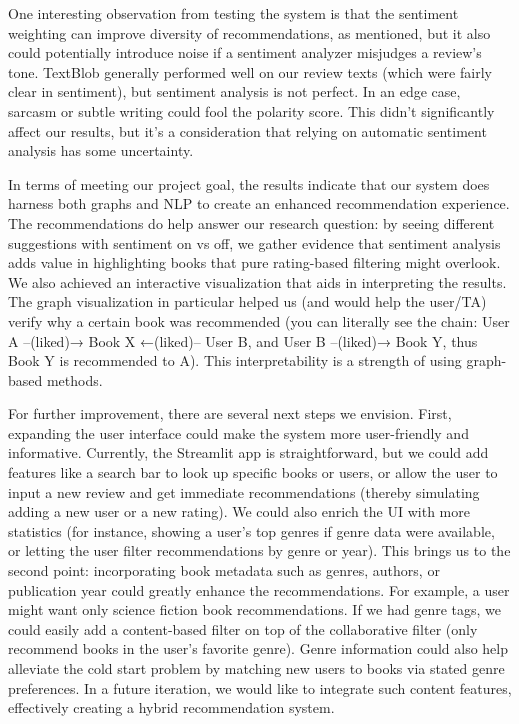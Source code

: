 \documentclass[11pt]{article}
\begin{document}
One interesting observation from testing the system is that the sentiment weighting can improve diversity of recommendations, as mentioned, but it also could potentially introduce noise if a sentiment analyzer misjudges a review’s tone. TextBlob generally performed well on our review texts (which were fairly clear in sentiment), but sentiment analysis is not perfect. In an edge case, sarcasm or subtle writing could fool the polarity score. This didn’t significantly affect our results, but it’s a consideration that relying on automatic sentiment analysis has some uncertainty.

In terms of meeting our project goal, the results indicate that our system does harness both graphs and NLP to create an enhanced recommendation experience. The recommendations do help answer our research question: by seeing different suggestions with sentiment on vs off, we gather evidence that sentiment analysis adds value in highlighting books that pure rating-based filtering might overlook. We also achieved an interactive visualization that aids in interpreting the results. The graph visualization in particular helped us (and would help the user/TA) verify why a certain book was recommended (you can literally see the chain: User A –(liked)→ Book X ←(liked)– User B, and User B –(liked)→ Book Y, thus Book Y is recommended to A). This interpretability is a strength of using graph-based methods.

For further improvement, there are several next steps we envision. First, expanding the user interface could make the system more user-friendly and informative. Currently, the Streamlit app is straightforward, but we could add features like a search bar to look up specific books or users, or allow the user to input a new review and get immediate recommendations (thereby simulating adding a new user or a new rating). We could also enrich the UI with more statistics (for instance, showing a user’s top genres if genre data were available, or letting the user filter recommendations by genre or year). This brings us to the second point: incorporating book metadata such as genres, authors, or publication year could greatly enhance the recommendations. For example, a user might want only science fiction book recommendations. If we had genre tags, we could easily add a content-based filter on top of the collaborative filter (only recommend books in the user’s favorite genre). Genre information could also help alleviate the cold start problem by matching new users to books via stated genre preferences. In a future iteration, we would like to integrate such content features, effectively creating a hybrid recommendation system.
\end{document}
